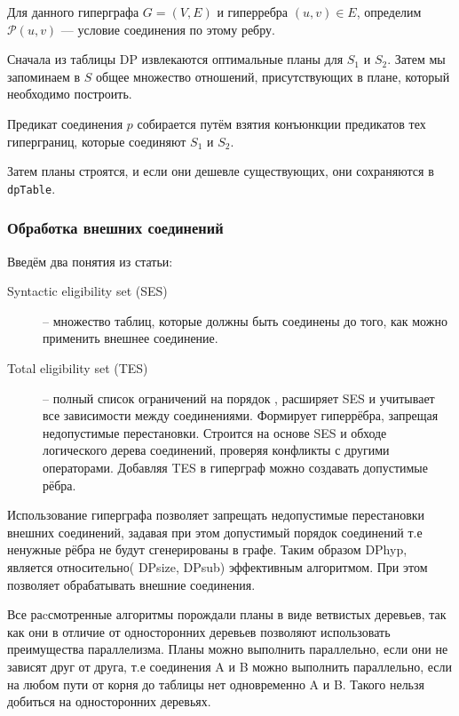 \documentclass[12pt]{article}
\begin{document}
\begin{flushleft}
Для данного гиперграфа $G = (V, E)$  
и гиперребра $(u, v) \in E$,  
определим $\mathcal{P}(u, v)$ —  
условие соединения по этому ребру.  

Сначала из таблицы DP  
извлекаются оптимальные планы для $S_1$ и $S_2$.  
Затем мы запоминаем в $S$ общее множество отношений,  
присутствующих в плане, который необходимо построить.  

Предикат соединения $p$ собирается  
путём взятия конъюнкции предикатов тех гиперграниц,  
которые соединяют $S_1$ и $S_2$.  

Затем планы строятся,  
и если они дешевле существующих,  
они сохраняются в \texttt{dpTable}.

\centering \subsubsection*{Обработка внешних соединений}
\raggedright

Введём два понятия из статьи:
\begin{description}
    \item[Syntactic eligibility set (SES)] --  множество таблиц, которые должны быть соединены до того, 
    как можно применить внешнее соединение.
    \item[Total eligibility set (TES)] --  полный список ограничений на порядок , расширяет SES и учитывает все зависимости между соединениями.
    Формирует гиперрёбра, запрещая недопустимые перестановки. 
    Строится на основе SES и обходе логического дерева соединений, проверяя конфликты с другими операторами. Добавляя TES в гиперграф
    можно создавать допустимые рёбра.
\end{description}
Использование гиперграфа позволяет запрещать недопустимые перестановки 
внешних соединений, задавая при этом допустимый порядок соединений 
т.е ненужные рёбра не будут сгенерированы в графе.
\newline
Таким образом DPhyp, является относительно( DPsize, DPsub) эффективным алгоритмом.
При этом позволяет обрабатывать внешние соединения.

Все раcсмотренные алгоритмы порождали планы в виде ветвистых деревьев, так как они 
в отличие от односторонних деревьев позволяют использовать преимущества параллелизма.
Планы можно выполнить параллельно, если они не зависят друг от друга, т.е 
соединения A и B можно выполнить параллельно, если на любом пути от корня 
до таблицы нет одновременно A и B. Такого нельзя добиться на односторонних 
деревьях.


\end{flushleft}
\end{document}
